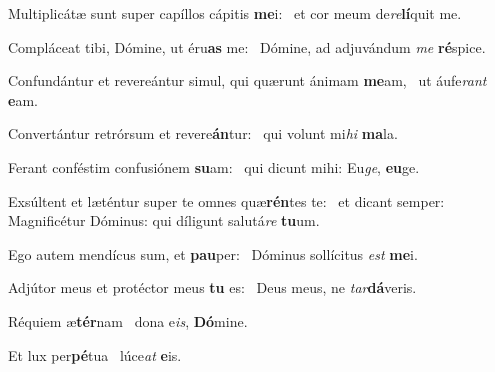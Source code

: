 \item Multiplicátæ sunt super capíllos cápitis \textbf{me}i:~\psstar{} et cor meum de\textit{re}\textbf{lí}quit me.
\item Compláceat tibi, Dómine, ut éru\textbf{as} me:~\psstar{} Dómine, ad adjuvándum \textit{me} \textbf{ré}spice.
\item Confundántur et revereántur simul, qui quærunt ánimam \textbf{me}am,~\psstar{} ut áufe\textit{rant} \textbf{e}am.
\item Convertántur retrórsum et revere\textbf{án}tur:~\psstar{} qui volunt mi\textit{hi} \textbf{ma}la.
\item Ferant conféstim confusiónem \textbf{su}am:~\psstar{} qui dicunt mihi: Eu\textit{ge}, \textbf{eu}ge.
\item Exsúltent et læténtur super te omnes quæ\textbf{rén}tes te:~\psstar{} et dicant semper: Magnificétur Dóminus: qui díligunt salutá\textit{re} \textbf{tu}um.
\item Ego autem mendícus sum, et \textbf{pau}per:~\psstar{} Dóminus sollícitus \textit{est} \textbf{me}i.
\item Adjútor meus et protéctor meus \textbf{tu} es:~\psstar{} Deus meus, ne \textit{tar}\textbf{dá}veris.
\item Réquiem æ\textbf{tér}nam~\psstar{} dona e\textit{is}, \textbf{Dó}mine.
\item Et lux per\textbf{pé}tua~\psstar{} lúce\textit{at} \textbf{e}is.
